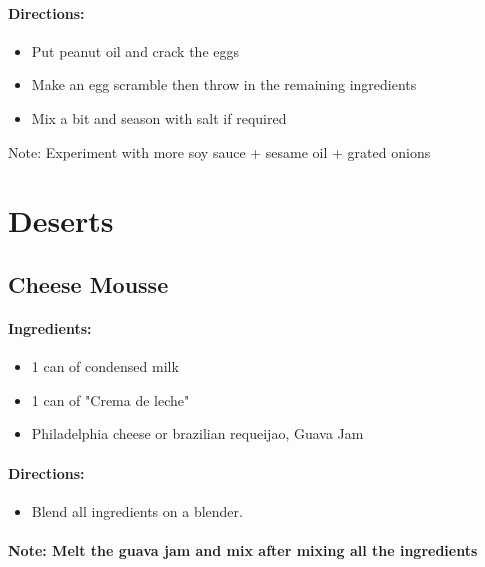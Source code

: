 \documentclass{article}
\begin{document}
\paragraph{Directions:}
\begin{itemize}
	\item Put peanut oil and crack the eggs
	\item Make an egg scramble then throw in the remaining ingredients
	\item Mix a bit and season with salt if required

\end{itemize}

Note: Experiment with more soy sauce + sesame oil + grated onions

\section{Deserts}

\newcommand{\mousse}[3]{
\subsection{#1 Mousse}

\paragraph{Ingredients:}

\begin{itemize}
	\item 1 can of condensed milk
	\item 1 can of "Crema de leche"
	\item #2
\end{itemize}

\paragraph{Directions:}
\begin{itemize}
	\item Blend all ingredients on a blender.
\end{itemize}

\paragraph{Note: #3}
}

\mousse{Cheese}{Philadelphia cheese or brazilian requeijao, Guava Jam}{Melt the guava jam and mix after mixing all the ingredients}
\end{document}
